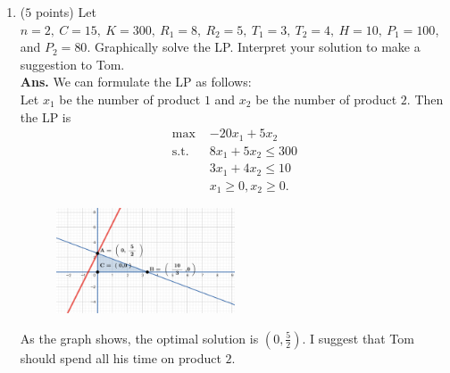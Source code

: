 \documentclass[12pt]{article}
\begin{document}
\begin{enumerate}
\begin{enumerate}
              \item ($5$ points) Let $n=2,\ C=15,\ K=300,\ R_1 =8,\ R_2 =5,\ T_1 =3,\ T_2 =4,\ H=10,\ P_1 =100$, and $P_2 = 80$. Graphically solve the LP. Interpret your solution to make a suggestion to Tom.\\
                    \textbf{Ans.}
                    We can formulate the LP as follows:\\
                    Let $x_1$ be the number of product $1$ and $x_2$ be the number of product $2$. Then the LP is
                    \begin{align*}
                        \text{max }  & -20x_1+5x_2             \\
                        \text{s.t. } & 8x_1+5x_2 \leq 300      \\
                                     & 3x_1+4x_2 \leq 10       \\
                                     & x_1 \geq 0, x_2 \geq 0.
                    \end{align*}
                    \begin{figure}[H]
                        \centering
                        \includegraphics[width=0.5\textwidth]{p3.png}
                    \end{figure}
                    As the graph shows, the optimal solution is $(0, \frac{5}{2})$.
                    I suggest that Tom should spend all his time on product $2$.
          \end{enumerate}
\end{enumerate}
\end{document}
